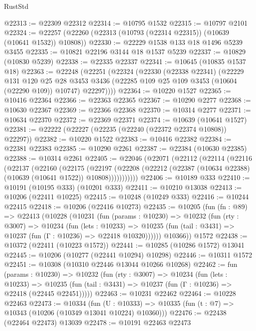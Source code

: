 \begin{lexlean}{RustStd}
\begin{coremodule}
@22313 := @22309 @22312
@22314 := @10795 @1532
@22315 := @10797 @2101
@22324 := @22257 (@22260 (@22313 (@10793 (@22314 @22315)) (@10639 (@10641 @1532)) @10808))
@22330 := @22229 @1538 @133 @18 @1496 @5239 @3455
@22335 := @10821 @22196 @3144 @18 @1537 @5239
@22337 := @10829 (@10830 @5239)
@22338 := @22335 @22337
@22341 := @10645 (@10835 @1537 @18)
@22363 := @22248
    (@22251
      (@22324
        (@22330
          (@22338 @22341)
          (@22229
            @131
            @120
            @25
            @28
            @3453
            @3436
            (@22285 @109 @25 @109 @3453 (@10604 (@22290 @109)) @10747)
            @22297))))
@22364 := @10220 @1527
@22365 := @10416 @22364
@22366 := @22363 @22365
@22367 := @10290 @2277
@22368 := @10630 @22367
@22369 := @22366 @22368
@22370 := @10314 @2277
@22371 := @10634 @22370
@22372 := @22369 @22371
@22374 := @10639 (@10641 @1527)
@22381 := @22222 (@22227 (@22235 (@22240 (@22372 @22374 @10808)) @22297))
@22382 := @10220 @1522
@22383 := @10416 @22382
@22384 := @22381 @22383
@22385 := @10290 @2261
@22387 := @22384 (@10630 @22385)
@22388 := @10314 @2261
@22405 := @22046
    (@22071
      (@22112
        (@22114
          (@22116
            (@22137
              (@22160
                (@22175
                  (@22197
                    (@22208
                      (@22212 (@22387 (@10634 @22388) (@10639 (@10641 @1522)) @10808)))))))))))
@22406 := @10189 @333
@22410 := @10191 (@10195 @333) (@10201 @333)
@22411 := @10210 @13038
@22413 := @10206 (@22411 @10225)
@22415 := @10248 (@10249 @333)
@22416 := @10244 @22415
@22418 := @10206 (@22416 @10273)
@22435 := @10205
    (fun (fn : @89) =>
    @22413
      (@10228
        (@10231
          (fun (params : @10230) =>
          @10232
            (fun (rty : @3007) =>
            @10234
              (fun (lets : @10233) =>
              @10235 (fun (tail : @3431) => @10237 (fun (Γ : @10236) => @22418 @10320))))))
        @10366))
    @1572
@22438 := @10372 (@22411 (@10223 @1572))
@22441 := @10285 (@10286 @1572) @13041
@22445 := @10206 (@10277 (@22441 @10294) @10298)
@22446 := @10311 @1572
@22451 := @10308 (@10310 @22446 @13044 @10266 @10268)
@22462 := fun (params : @10230) =>
  @10232
    (fun (rty : @3007) =>
    @10234
      (fun (lets : @10233) =>
      @10235 (fun (tail : @3431) => @10237 (fun (Γ : @10236) => @22418 (@22445 @22451)))))
@22463 := @10231 @22462
@22464 := @10228 @22463
@22473 := @10334
    (fun (U : @10333) => @10335 (fun (t : @7) => @10343 (@10206 (@10349 @13041 @10224) @10360)))
@22476 := @22438 (@22464 @22473) @13039
@22478 := @10191 @22463 @22473

\end{coremodule}
\end{lexlean}
